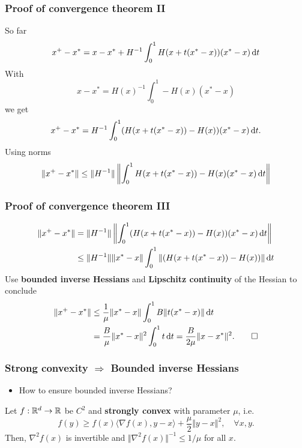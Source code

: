 \documentclass{beamer}
\begin{document}
\begin{frame}
  \frametitle{Proof of convergence theorem II}
  So far
  \begin{equation}
      x^+ - x^* = x - x^* + H^{-1} \int_{0}^{1} H(x + t(x^* - x))(x^* - x) \mathop{}\!\mathrm{d} t
  \end{equation}
  With
  \begin{equation}
    x- x^* = {H(x)}^{-1} \int_{0}^{1} - H(x)(x^*-x)
  \end{equation}
  we get
  \begin{equation}
    x^+ - x^* =  H^{-1} \int_{0}^{1} (H(x + t(x^* - x))- H(x))(x^* - x) \mathop{}\!\mathrm{d} t.
  \end{equation}
  Using norms
  \begin{equation}
    \Vert x^+ - x^*  \Vert \le  \Vert H^{-1} \Vert \left\Vert  \int_{0}^{1} H(x + t(x^* - x))- H(x)(x^* - x) \mathop{}\!\mathrm{d} t \right\Vert
  \end{equation}
\end{frame}


\begin{frame}
  \frametitle{Proof of convergence theorem III}

  \begin{align}
    \Vert x^+ - x^*  \Vert &=  \Vert H^{-1} \Vert \left\Vert  \int_{0}^{1} (H(x + t(x^* - x))- H(x))(x^* - x) \mathop{}\!\mathrm{d} t \right\Vert \\
    &\le \Vert H^{-1} \Vert  \Vert x^* - x \Vert \int_{0}^{1} \left\Vert  (H(x + t(x^* - x))- H(x)) \right\Vert \mathop{}\!\mathrm{d} t
  \end{align}
  Use \textbf{bounded inverse Hessians} and \textbf{Lipschitz continuity} of the Hessian to conclude
  \begin{align}
    \Vert x^+ - x^*  \Vert  &\le \frac{1}{\mu} \Vert x^* - x \Vert \int_{0}^{1} B \Vert t(x^*-x) \Vert \mathop{}\!\mathrm{d} t  \\
    &= \frac{B}{\mu} \Vert x^*-x \Vert^2 \int_{0}^{1}t \mathop{}\!\mathrm{d} t = \frac{B}{2\mu} \Vert x-x^* \Vert^2. \qed
  \end{align}

\end{frame}


\begin{frame}
  \frametitle{Strong convexity $\Rightarrow$ Bounded inverse Hessians}

  \begin{itemize}
    \item How to ensure bounded inverse Hessians?
  \end{itemize}

  \begin{lemma}%
    Let $f: \mathbb{R}^d \to \mathbb{R}$ be $C^2$ and \textbf{strongly convex} with parameter $\mu$, i.e.\
    \begin{equation}
      f(y) \ge f(x) \langle \nabla f(x), y-x \rangle + \frac{\mu}{2} \Vert y-x \Vert^2, \quad \forall x,y.
    \end{equation}
  Then, $\nabla^2 f(x)$ is invertible and $\Vert \nabla^2 f(x) \Vert^{-1} \le 1/\mu$ for all $x$.
  \end{lemma}

\end{frame}
\end{document}
